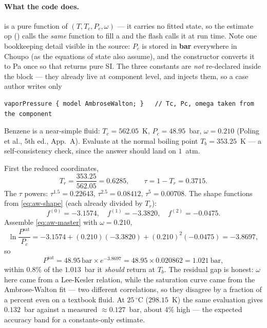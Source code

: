 \documentclass[11pt,a4paper]{article}
\newcommand{\Psat}{P^{\mathrm{sat}}}
\begin{document}
\paragraph{What the code does.}   is a pure
function of $(T, T_c, P_c, \omega)$ --- it carries no fitted state, so
the estimate op () calls the \emph{same}
function to fill a  and the flash calls it at run time.
Note one bookkeeping detail visible in the source: $P_c$ is stored in
\textbf{bar} everywhere in Choupo (as the equations of state also
assume), and the constructor converts it to Pa once so that
 returns pure SI.  The three constants are \emph{not}
re-declared inside the  block --- they already
live at component level, and  injects them,
so a case author writes only

\begin{lstlisting}
vaporPressure { model AmbroseWalton; }   // Tc, Pc, omega taken from the component
\end{lstlisting}

\begin{example}[Ambrose-Walton $\Psat$ of benzene]
Benzene is a near-simple fluid: $T_c = 562.05$~K, $P_c = 48.95$~bar,
$\omega = 0.210$ (Poling et al., 5th ed., App.~A).  Evaluate at the
normal boiling point $T_b = 353.25$~K --- a self-consistency check,
since the answer should land on $1$~atm.

First the reduced coordinates,
\[
   T_r = \frac{353.25}{562.05} = 0.6285,
   \qquad
   \tau = 1 - T_r = 0.3715 .
\]
The $\tau$ powers: $\tau^{1.5} = 0.22643$, $\tau^{2.5} = 0.08412$,
$\tau^{5} = 0.00708$.  The shape functions from \eqref{eq:aw-shape}
(each already divided by $T_r$):
\[
   f^{(0)} = -3.1574,\quad
   f^{(1)} = -3.3820,\quad
   f^{(2)} = -0.0475 .
\]
Assemble \eqref{eq:aw-master} with $\omega = 0.210$,
\[
   \ln\!\frac{\Psat}{P_c}
   = -3.1574 + (0.210)(-3.3820) + (0.210)^2(-0.0475)
   = -3.8697 ,
\]
so
\[
   \Psat = 48.95\,\mathrm{bar}\times e^{-3.8697}
         = 48.95 \times 0.020862
         = 1.021~\mathrm{bar},
\]
within $0.8\%$ of the $1.013$~bar it \emph{should} return at $T_b$.
The residual gap is honest: $\omega$ here came from a Lee-Kesler
relation, while the saturation curve came from the Ambrose-Walton fit
--- two different correlations, so they disagree by a fraction of a
percent even on a textbook fluid.  At $25\,^\circ$C ($298.15$~K) the
same evaluation gives $0.132$~bar against a measured $\approx
0.127$~bar, about $4\%$ high --- the expected accuracy band for a
constants-only estimate.
\end{example}
\end{document}
